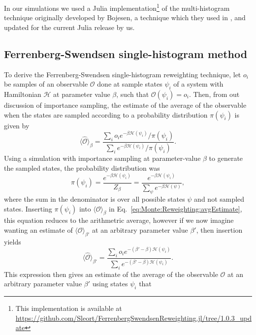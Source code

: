 In our simulations we used a Julia implementation\footnote{This implementation is available at
\url{https://github.com/Sleort/FerrenbergSwendsenReweighting.jl/tree/1.0.3_update}}
 of the multi-histogram technique originally developed by Bojesen, a technique which they used in \cite{Bojesen13M},
and updated for the current Julia release by us.

\subsection{Ferrenberg-Swendsen single-histogram method}

To derive the Ferrenberg-Swendsen single-histogram reweighting technique, let $o_i$ be samples of an observable $\mathcal{O}$ done at sample states $\psi_i$ of a system
with Hamiltonian $\mathcal{H}$ at parameter value $\beta$, such that $\mathcal{O}(\psi_i) = o_i$.
Then, from out discussion of importance sampling, the estimate of the average of the observable when the states are sampled
according to a probability distribution $\pi(\psi_i)$ is given by
\begin{equation}
    \label{eq:Monte:Reweighting:avgEstimate}
    \langle \hat{\mathcal{O}}\rangle_\beta = \frac{\sum_io_ie^{-\beta\mathcal{H}(\psi_i)}/\pi(\psi_i)}{\sum_ie^{-\beta\mathcal{H}(\psi_i)}/\pi(\psi_i)}.
\end{equation}
Using a simulation with importance sampling at parameter-value $\beta$ to generate the sampled states, the probability distribution was
\begin{equation}
    \label{eq:Monte:Reweighting:probDist}
    \pi(\psi_i) = \frac{e^{-\beta\mathcal{H}(\psi_i)}}{Z_\beta} = \frac{e^{-\beta\mathcal{H}(\psi_i)}}{\sum_\psi e^{-\beta\mathcal{H}(\psi)}},
\end{equation}
where the sum in the denominator is over all possible states $\psi$ and not sampled states. Inserting $\pi(\psi_i)$ into $\langle\mathcal{O}\rangle_\beta$
in Eq.~\eqref{eq:Monte:Reweighting:avgEstimate}, this equation reduces to the arithmetric average, however if we now imagine wanting an estimate of
$\langle\mathcal{O}\rangle_{\beta'}$ at an arbitrary parameter value $\beta'$, then insertion yields
\begin{equation}
    \label{eq:Monte:Reweighting:FS}
    \langle \hat{\mathcal{O}}\rangle_{\beta'} = \frac{\sum_io_ie^{-(\beta'-\beta)\mathcal{H}(\psi_i)}}{\sum_ie^{-(\beta'-\beta)\mathcal{H}(\psi_i)}}.
\end{equation}
This expression then gives an estimate of the average of the observable $\mathcal{O}$ at an arbitrary parameter value $\beta'$ using states $\psi_i$ that
